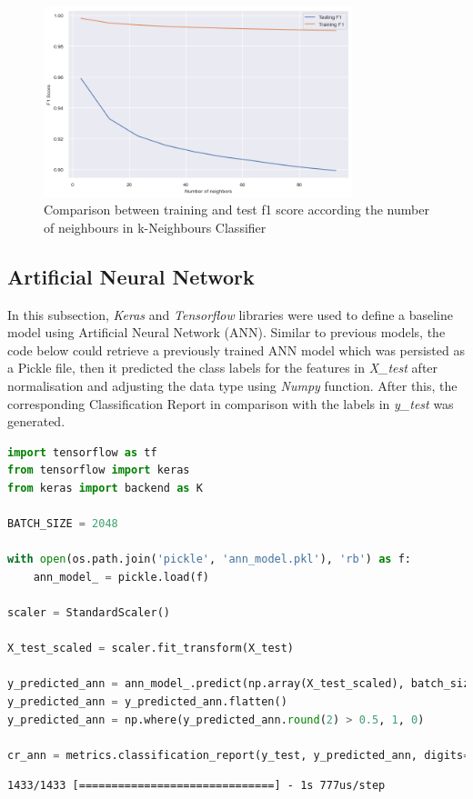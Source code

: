 \documentclass{article}
\begin{document}
\begin{figure}
\centering
\includegraphics[width=0.8\textwidth]{knn_overfitting.png}
\caption{\label{fig:knn_overfitting}Comparison between training and test f1 score according the number of neighbours in k-Neighbours Classifier}
\end{figure}

\subsection{Artificial Neural Network}

In this subsection, \emph{Keras} and \emph{Tensorflow} libraries were used to define a baseline model using Artificial Neural Network (ANN). Similar to previous models, the code below could retrieve a previously trained ANN model which was persisted as a Pickle file, then it predicted the class labels for the features in \emph{X\_test} after normalisation and adjusting the data type using \emph{Numpy} function. After this, the corresponding Classification Report in comparison with the labels in \emph{y\_test} was generated. 

\begin{lstlisting}[language=Python]
import tensorflow as tf
from tensorflow import keras
from keras import backend as K

BATCH_SIZE = 2048

with open(os.path.join('pickle', 'ann_model.pkl'), 'rb') as f: 
    ann_model_ = pickle.load(f)
    
scaler = StandardScaler()    

X_test_scaled = scaler.fit_transform(X_test)

y_predicted_ann = ann_model_.predict(np.array(X_test_scaled), batch_size=BATCH_SIZE)
y_predicted_ann = y_predicted_ann.flatten()
y_predicted_ann = np.where(y_predicted_ann.round(2) > 0.5, 1, 0)

cr_ann = metrics.classification_report(y_test, y_predicted_ann, digits=5)    
\end{lstlisting}
\begin{verbatim}
1433/1433 [==============================] - 1s 777us/step
\end{verbatim}
\end{document}
